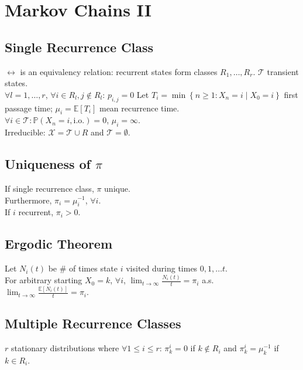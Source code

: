 \section{Markov Chains II}
	\subsection*{Single Recurrence Class}
	$\leftrightarrow$ is an equivalency relation: recurrent states form classes $R_{1}, \dots, R_{r}$. $\mathcal{T}$ transient states.\\
	$\forall l = 1, \dots, r$, $\forall i\in R_{l}, j\notin R_{l}$: $p_{i, j} = 0$
	Let $T_{i} = \min\left\{n\geq 1: X_{n} = i\mid X_{0} = i\right\}$ first passage time; $\mu_{i} = \mathbb{E}\left[T_{i}\right]$ mean recurrence time.\\
	$\forall i\in\mathcal{T}: \mathbb{P}\left(X_{n} = i,\text{i.o.}\right) = 0$, $\mu_{i} = \infty$.\\
	Irreducible: $\mathcal{X} = \mathcal{T}\cup R$ and $\mathcal{T} = \emptyset$.
	
	\subsection*{Uniqueness of $\pi$}
	If single recurrence class, $\pi$ unique.\\
	Furthermore, $\pi_{i} = \mu_{i}^{-1}$, $\forall i$.\\
	If $i$ recurrent, $\pi_{i} > 0$.
	
	\subsection*{Ergodic Theorem}
	Let $N_{i}\left(t\right)$ be \# of times state $i$ visited during times $0, 1, \dots t$.\\
	For arbitrary starting $X_{0} = k$, $\forall i$, $\lim_{t\to\infty}\frac{N_{i}\left(t\right)}{t} = \pi_{i}$ a.s.\\
	$\lim_{t\to\infty}\frac{\mathbb{E}\left[N_{i}\left(t\right)\right]}{t} = \pi_{i}$.
	
	\subsection*{Multiple Recurrence Classes}
	$r$ stationary distributions where $\forall 1\leq i\leq r$: $\pi_{k}^{i} = 0$ if $k\notin R_{i}$ and $\pi_{k}^{i} = \mu_{k}^{-1}$ if $k\in R_{i}$.
